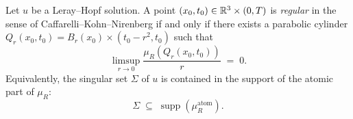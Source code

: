 \begin{theorem}\label{thm:ckn-bridge}
  Let $u$ be a Leray--Hopf solution.  A point $(x_0,t_0) \in \mathbb{R}^3\times(0,T)$
  is \emph{regular} in the sense of Caffarelli--Kohn--Nirenberg \cite{caffarelli1982partial}
  if and only if there exists a parabolic cylinder
  $Q_r(x_0,t_0) = B_r(x_0)\times(t_0-r^2,t_0)$ such that
  \begin{equation}\label{eq:ckn-epsilon}
    \limsup_{r\to 0} \frac{\mu_R(Q_r(x_0,t_0))}{r} \;=\; 0.
  \end{equation}
  Equivalently, the singular set $\Sigma$ of $u$ is contained in the support of
  the atomic part of $\mu_R$:
  \begin{equation}\label{eq:singular-set-atoms}
    \Sigma \;\subseteq\; \operatorname{supp}(\mu_R^{\mathrm{atom}}).
  \end{equation}
\end{theorem}


